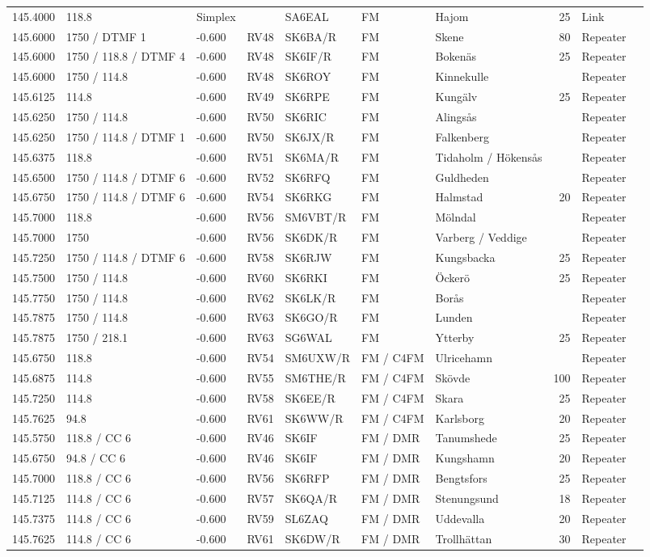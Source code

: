 \begin{longtable}{lllllllrlr}
145.4000&118.8&Simplex&&SA6EAL&FM&Hajom&25&Link&\\
145.6000&1750 / DTMF 1&-0.600&RV48&SK6BA/R&FM&Skene&80&Repeater&\\
145.6000&1750 / 118.8 / DTMF 4&-0.600&RV48&SK6IF/R&FM&Bokenäs&25&Repeater&\\
145.6000&1750 / 114.8&-0.600&RV48&SK6ROY&FM&Kinnekulle&&Repeater&\\
145.6125&114.8&-0.600&RV49&SK6RPE&FM&Kungälv&25&Repeater&\\
145.6250&1750 / 114.8&-0.600&RV50&SK6RIC&FM&Alingsås&&Repeater&\\
145.6250&1750 / 114.8 / DTMF 1&-0.600&RV50&SK6JX/R&FM&Falkenberg&&Repeater&\\
145.6375&118.8&-0.600&RV51&SK6MA/R&FM&Tidaholm / Hökensås&&Repeater&\\
145.6500&1750 / 114.8 / DTMF 6&-0.600&RV52&SK6RFQ&FM&Guldheden&&Repeater&\\
145.6750&1750 / 114.8 / DTMF 6&-0.600&RV54&SK6RKG&FM&Halmstad&20&Repeater&\\
145.7000&118.8&-0.600&RV56&SM6VBT/R&FM&Mölndal&&Repeater&\\
145.7000&1750&-0.600&RV56&SK6DK/R&FM&Varberg / Veddige&&Repeater&\\
145.7250&1750 / 114.8 / DTMF 6&-0.600&RV58&SK6RJW&FM&Kungsbacka&25&Repeater&\\
145.7500&1750 / 114.8&-0.600&RV60&SK6RKI&FM&Öckerö&25&Repeater&\\
145.7750&1750 / 114.8&-0.600&RV62&SK6LK/R&FM&Borås&&Repeater&\\
145.7875&1750 / 114.8&-0.600&RV63&SK6GO/R&FM&Lunden&&Repeater&\\
145.7875&1750 / 218.1&-0.600&RV63&SG6WAL&FM&Ytterby&25&Repeater&\\
145.6750&118.8&-0.600&RV54&SM6UXW/R&FM / C4FM&Ulricehamn&&Repeater&\\
145.6875&114.8&-0.600&RV55&SM6THE/R&FM / C4FM&Skövde&100&Repeater&\\
145.7250&114.8&-0.600&RV58&SK6EE/R&FM / C4FM&Skara&25&Repeater&\\
145.7625&94.8&-0.600&RV61&SK6WW/R&FM / C4FM&Karlsborg&20&Repeater&\\
145.5750&118.8 / CC 6&-0.600&RV46&SK6IF&FM / DMR&Tanumshede&25&Repeater&\\
145.6750&94.8 / CC 6&-0.600&RV46&SK6IF&FM / DMR&Kungshamn&20&Repeater&\\
145.7000&118.8 / CC 6&-0.600&RV56&SK6RFP&FM / DMR&Bengtsfors&25&Repeater&\\
145.7125&114.8 / CC 6&-0.600&RV57&SK6QA/R&FM / DMR&Stenungsund&18&Repeater&\\
145.7375&114.8 / CC 6&-0.600&RV59&SL6ZAQ&FM / DMR&Uddevalla&20&Repeater&\\
145.7625&114.8 / CC 6&-0.600&RV61&SK6DW/R&FM / DMR&Trollhättan&30&Repeater&\\
\end{longtable}
